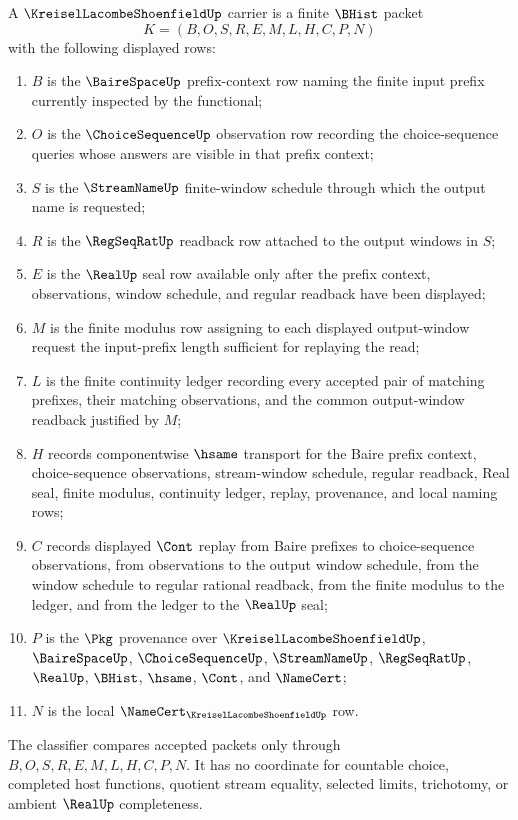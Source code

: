 \begin{definition}\label{def:kreisel-lacombe-shoenfield-carrier}
A $\KreiselLacombeShoenfieldUp$ carrier is a finite $\BHist$ packet
$$
K=(B,O,S,R,E,M,L,H,C,P,N)
$$
with the following displayed rows:
\begin{enumerate}
\item $B$ is the $\BaireSpaceUp$ prefix-context row naming the finite input prefix currently inspected by the functional;
\item $O$ is the $\ChoiceSequenceUp$ observation row recording the choice-sequence queries whose answers are visible in that prefix context;
\item $S$ is the $\StreamNameUp$ finite-window schedule through which the output name is requested;
\item $R$ is the $\RegSeqRatUp$ readback row attached to the output windows in $S$;
\item $E$ is the $\RealUp$ seal row available only after the prefix context, observations, window schedule, and regular readback have been displayed;
\item $M$ is the finite modulus row assigning to each displayed output-window request the input-prefix length sufficient for replaying the read;
\item $L$ is the finite continuity ledger recording every accepted pair of matching prefixes, their matching observations, and the common output-window readback justified by $M$;
\item $H$ records componentwise $\hsame$ transport for the Baire prefix context, choice-sequence observations, stream-window schedule, regular readback, Real seal, finite modulus, continuity ledger, replay, provenance, and local naming rows;
\item $C$ records displayed $\Cont$ replay from Baire prefixes to choice-sequence observations, from observations to the output window schedule, from the window schedule to regular rational readback, from the finite modulus to the ledger, and from the ledger to the $\RealUp$ seal;
\item $P$ is the $\Pkg$ provenance over $\KreiselLacombeShoenfieldUp$, $\BaireSpaceUp$, $\ChoiceSequenceUp$, $\StreamNameUp$, $\RegSeqRatUp$, $\RealUp$, $\BHist$, $\hsame$, $\Cont$, and $\NameCert$;
\item $N$ is the local $\NameCert_{\KreiselLacombeShoenfieldUp}$ row.
\end{enumerate}
The classifier compares accepted packets only through $B,O,S,R,E,M,L,H,C,P,N$. It has no coordinate for countable choice, completed host functions, quotient stream equality, selected limits, trichotomy, or ambient $\RealUp$ completeness.
\end{definition}


